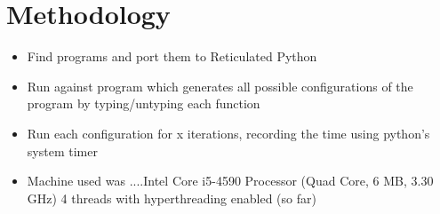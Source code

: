
\section{Methodology}
\begin{itemize}
\item
  Find programs and port them to Reticulated Python

\item
  Run against program which generates all possible configurations of the program by typing/untyping each function
\item
  Run each configuration for x iterations, recording the time using python's system timer
\item
  Machine used was ....Intel Core i5-4590 Processor (Quad Core, 6 MB, 3.30 GHz) 4 threads with hyperthreading enabled (so far)
  
\end{itemize}


